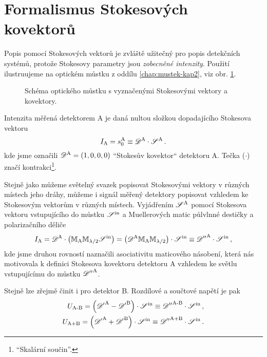 \section{Formalismus Stokesových kovektorů}
\label{app:kovektory}


Popis pomocí Stokesových vektorů je zvláště užitečný pro popis detekčních systémů, protože Stokesovy parametry jsou \emph{zobecněné intenzity}.
Použití ilustruujeme na optickém můstku z oddílu \ref{chap:mustek-kap2}, viz obr. \ref{fig:mustek-dodatek}.

\begin{figure}[htbp]
    \centering
    \caption{Schéma optického můstku s vyznačenými Stokesovými vektory a kovektory.}
    \label{fig:mustek-dodatek}
\end{figure}

Intenzita měřená detektorem A je daná nultou složkou dopadajícího Stokesova vektoru
\begin{equation}
    I_\textrm{A}=s_0^\textrm{A} \equiv \mathscr{D}^\textrm{A} \cdot \mathscr{S}^\textrm{A} \,.
\end{equation}
kde jsme označili $\mathscr{D}^\textrm{A}=(1, 0, 0, 0)$ ``Stokesův kovektor`` detektoru A. 
Tečka ($\cdot$) značí kontrakci\footnote{``Skalární součin''.}.

Stejně jako můžeme světelný svazek popisovat Stokesovými vektory v různých místech jeho dráhy, můžeme i signál měřený detektory popisovat vzhledem ke Stokesovým vektorům v různých místech.
Vyjádřením $\mathscr{S}^\textrm{A}$ pomocí Stokesova vektoru vstupujícího do můstku $\mathscr{S}^\textrm{in}$ a Muellerových matic půlvlnné destičky a polarizačního děliče
\begin{equation}
    I_\textrm{A}= \mathscr{D}^\textrm{A} \cdot \left( \mathbb{M}_\textrm{A} \mathbb{M}_{\lambda/2} \mathscr{S}^\textrm{in} \right) = \left( \mathscr{D}^\textrm{A} \mathbb{M}_\textrm{A} \mathbb{M}_{\lambda/2}\right) \cdot \mathscr{S}^\textrm{in} \equiv {\mathscr{D}''}^\textrm{A} \cdot \mathscr{S}^\textrm{in}  \,,
\end{equation}
kde jsme druhou rovností naznačili asociativitu maticového násobení, která nás motivovala k definici Stokesova kovektoru detektoru A vzhledem ke světlu vstupujícímu do můstku ${\mathscr{D}''}^\textrm{A}$.

Stejně lze zřejmě činit i pro detektor B.
Rozdílové a součtové napětí je pak
\begin{align}
\label{eqn:af}
U_\textrm{A-B} = \left( {\mathscr{D}'}^\textrm{A}-{\mathscr{D}'}^\textrm{B}\right) \cdot \mathscr{S}^\textrm{in} \equiv {\mathscr{D}''}^\textrm{A-B}\cdot \mathscr{S}^\textrm{in} \,, \\
U_\textrm{A+B} = \left({\mathscr{D}'}^\textrm{A}+{\mathscr{D}'}^\textrm{B}\right) \cdot \mathscr{S}^\textrm{in} \equiv {\mathscr{D}''}^\textrm{A+B}\cdot \mathscr{S}^\textrm{in} \,.
\end{align}

